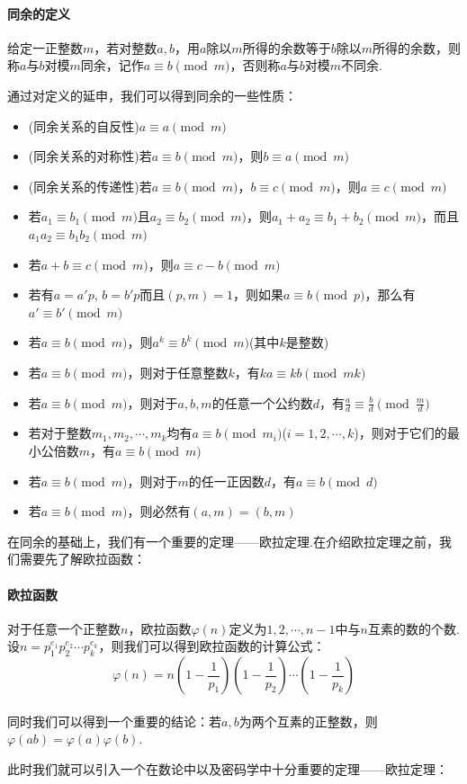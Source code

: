 \documentclass{book}
\numberwithin{equation}{subsubsection}
\begin{document}
\paragraph{\textbf{同余的定义}}
给定一正整数$m$，若对整数$a,b$，用$a$除以$m$所得的余数等于$b$除以$m$所得的余数，则称$a$与$b$对模$m$同余，记作$a\equiv b\pmod{m}$，否则称$a$与$b$对模$m$不同余.\par
通过对定义的延申，我们可以得到同余的一些性质：
\begin{itemize}
    \item (同余关系的自反性)$a\equiv a\pmod{m}$
    \item (同余关系的对称性)若$a\equiv b\pmod{m}$，则$b\equiv a\pmod{m}$
    \item (同余关系的传递性)若$a\equiv b\pmod{m}$，$b\equiv c\pmod{m}$，则$a\equiv c\pmod{m}$
    \item 若$a_1\equiv b_1\pmod{m}$且$a_2\equiv b_2\pmod{m}$，则$a_1+a_2\equiv b_1+b_2\pmod{m}$，而且$a_1a_2\equiv b_1b_2\pmod{m}$
    \item 若$a+b\equiv c\pmod{m}$，则$a\equiv c-b\pmod{m}$
    \item 若有$a=a'p$, $b=b'p$而且$(p,m)=1$，则如果$a\equiv b\pmod{p}$，那么有$a'\equiv b'\pmod{m}$
    \item 若$a\equiv b\pmod{m}$，则$a^k\equiv b^k\pmod{m}$(其中$k$是整数)
    \item 若$a\equiv b\pmod{m}$，则对于任意整数$k$，有$ka\equiv kb\pmod{mk}$
    \item 若$a\equiv b\pmod{m}$，则对于$a,b,m$的任意一个公约数$d$，有$\frac{a}{d}\equiv \frac{b}{d}\pmod{\frac{m}{d}}$
    \item 若对于整数$m_1,m_2,\cdots,m_k$均有$a\equiv b\pmod{m_i}$($i=1,2,\cdots,k$)，则对于它们的最小公倍数$m$，有$a\equiv b\pmod{m}$
    \item 若$a\equiv b\pmod{m}$，则对于$m$的任一正因数$d$，有$a\equiv b\pmod{d}$
    \item 若$a\equiv b\pmod{m}$，则必然有$(a,m)=(b,m)$
\end{itemize}\par
在同余的基础上，我们有一个重要的定理——欧拉定理.在介绍欧拉定理之前，我们需要先了解欧拉函数：
\paragraph{\textbf{欧拉函数}}
对于任意一个正整数$n$，欧拉函数$\varphi(n)$定义为$1,2,\cdots,n-1$中与$n$互素的数的个数.
设$n=p_1^{e_1}p_2^{e_2}\cdots p_k^{e_k}$，则我们可以得到欧拉函数的计算公式：
\begin{equation}
    \varphi(n)=n\left(1-\frac{1}{p_1}\right)\left(1-\frac{1}{p_2}\right)\cdots\left(1-\frac{1}{p_k}\right)
    \nonumber
\end{equation}\\
同时我们可以得到一个重要的结论：若$a,b$为两个互素的正整数，则$\varphi(ab)=\varphi(a)\varphi(b)$.\par
此时我们就可以引入一个在数论中以及密码学中十分重要的定理——欧拉定理：
\end{document}
